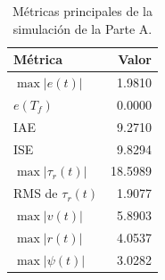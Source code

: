 \begin{table}[H]
\centering
\caption{Métricas principales de la simulación de la Parte A.}
\label{tab:parte-a-metricas}
\begin{tabular}{lr}
\toprule
Métrica & Valor \\
\midrule
$\max |e(t)|$ & 1.9810 \\
$e(T_f)$ & 0.0000 \\
IAE & 9.2710 \\
ISE & 9.8294 \\
$\max |\tau_r(t)|$ & 18.5989 \\
RMS de $\tau_r(t)$ & 1.9077 \\
$\max |v(t)|$ & 5.8903 \\
$\max |r(t)|$ & 4.0537 \\
$\max |\psi(t)|$ & 3.0282 \\
\bottomrule
\end{tabular}
\end{table}

